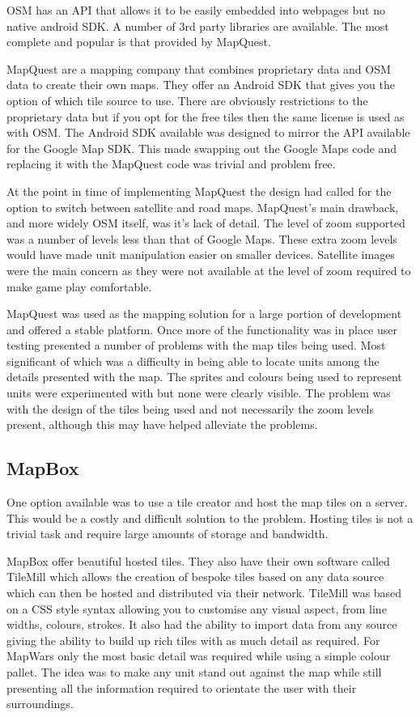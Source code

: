 OSM has an API that allows it to be easily embedded into webpages but no native android SDK. A number of 3rd party libraries are available. The most complete and popular is that provided by MapQuest.

MapQuest are a mapping company that combines proprietary data and OSM data to create their own maps. They offer an Android SDK that gives you the option of which tile source to use. There are obviously restrictions to the proprietary data but if you opt for the free tiles then the same license is used as with OSM. The Android SDK available was designed to mirror the API available for the Google Map SDK. This made swapping out the Google Maps code and replacing it with the MapQuest code was trivial and problem free.

At the point in time of implementing MapQuest the design had called for the option to switch between satellite and road maps. MapQuest's main drawback, and more widely OSM itself, was it's lack of detail. The level of zoom supported was a number of levels less than that of Google Maps. These extra zoom levels would have made unit manipulation easier on smaller devices. Satellite images were the main concern as they were not available at the level of zoom required to make game play comfortable.

MapQuest was used as the mapping solution for a large portion of development and offered a stable platform. Once more of the functionality was in place user testing presented a number of problems with the map tiles being used. Most significant of which was a difficulty in being able to locate units among the details presented with the map. The sprites and colours being used to represent units were experimented with but none were clearly visible. The problem was with the design of the tiles being used and not necessarily the zoom levels present, although this may have helped alleviate the problems.

\subsection{MapBox}
One option available was to use a tile creator and host the map tiles on a server. This would be a costly and difficult solution to the problem. Hosting tiles is not a trivial task and require large amounts of storage and bandwidth.

MapBox offer beautiful hosted tiles. They also have their own software called TileMill which allows the creation of bespoke tiles based on any data source which can then be hosted and distributed via their network. TileMill was based on a CSS style syntax allowing you to customise any visual aspect, from line widths, colours, strokes. It also had the ability to import data from any source giving the ability to build up rich tiles with as much detail as required. For MapWars only the most basic detail was required while using a simple colour pallet. The idea was to make any unit stand out against the map while still presenting all the information required to orientate the user with their surroundings. 

